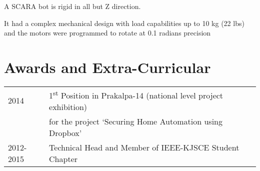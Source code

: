 \documentclass[]{deedy_format_Anmol}
\begin{document}
\begin{minipage}[t]{0.66\textwidth}
\vspace{1mm}
\justify
\begin{tightemize}
\item A SCARA bot is rigid in all but Z direction. 
\item It had a complex mechanical design with load capabilities up to 10 kg (22 lbs) and the motors were programmed to rotate at 0.1 radians precision
\end{tightemize} 
\vspace{\topsep}
\sectionsep


\section{Awards and Extra-Curricular}
\vspace{\topsep} %
\vspace{1mm}
\justify
\begin{tabular}{ll}
2014 & 1\textsuperscript{st} Position in Prakalpa-14 (national level project exhibition) \\
& for the project `Securing Home Automation using Dropbox'\\
2012-2015 & Technical Head and Member of IEEE-KJSCE Student Chapter \\
\end{tabular}

\end{minipage} 
\end{document}
